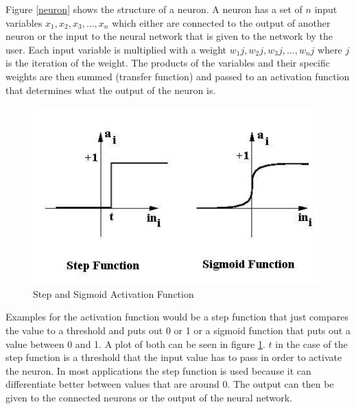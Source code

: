 
Figure \ref{neuron} shows the structure of a neuron. A neuron has a set of $n$ input variables $x_1, x_2, x_3, ..., x_n$ which either are connected to the output of another neuron or the input to the neural network that is given to the network by the user. Each input variable is multiplied with a weight $w_1j, w_2j, w_3j, ..., w_nj$ where $j$ is the iteration of the weight. The products of the variables and their specific weights are then summed (transfer function) and passed to an activation function that determines what the output of the neuron is. \cite{introToNNs}

\begin{figure}[ht]
	\centering
  \includegraphics[width=11cm]{figures/activation_functions}
	\caption[Step and Sigmoid Activation Function]{Step and Sigmoid Activation Function \protect\footnotemark}
	\label{activation_functions}
\end{figure}


Examples for the activation function would be a step function that just compares the value to a threshold and puts out 0 or 1 or a sigmoid function that puts out a value between 0 and 1. A plot of both can be seen in figure \ref{activation_functions}. $t$ in the case of the step function is a threshold that the input value has to pass in order to activate the neuron. In most applications the step function is used because it can differentiate better between values that are around 0. The output can then be given to the connected neurons or the output of the neural network. \cite{introToNNs}

